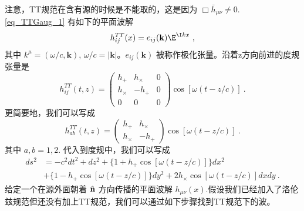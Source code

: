 注意，TT规范在含有源的时候是不能取的，这是因为 $\Box \bar h_{\mu\nu} \neq 0$. \autoref{eq_TTGaug_1} 有如下的平面波解
\begin{equation}
h_{ij}^{TT} (x) = e_{ij} (\mathbf k) \E^{\I kx} ~,  
\end{equation}
其中 $k^\mu = (\omega/c,\mathbf k)$, $\omega/c = |\mathbf k|$。$e_{ij}(\mathbf k)$ 被称作极化张量。沿着z方向前进的度规张量是
\begin{equation}
h_{ij}^{TT} (t,z) = 
\begin{pmatrix}
h_+ & h_\times & 0 \\
h_\times & - h_+ & 0 \\
0 & 0 & 0
\end{pmatrix} \cos [\omega (t - z/c)]~. 
\end{equation}
更简要地，我们可以写成
\begin{equation}\label{eq_TTGaug_2}
h_{ab}^{TT} (t,z) = 
\begin{pmatrix}
h_+ & h_\times   \\
h_\times & - h_+   
\end{pmatrix} \cos [\omega (t - z/c)]~. 
\end{equation}
其中 $a,b = 1,2$. 代入到度规中，我们可以写成
\begin{equation}
\begin{aligned}
ds^2 & = - c^2 dt^2 + dz^2 + \{ 1+ h_+ \cos [\omega(t-z/c)] \} dx^2 \\
& + \{ 1-h_+ \cos [\omega(t-z/c)] \} dy^2 + 2 h_\times \cos[\omega(t-z/c)] dx dy~.
\end{aligned}
\end{equation}
给定一个在源外面朝着 $\hat{\bf{n}}$ 方向传播的平面波解 $h_{\mu\nu}(x)$.假设我们已经加入了洛伦兹规范但还没有加上TT规范，我们可以通过如下步骤找到TT规范下的波。

